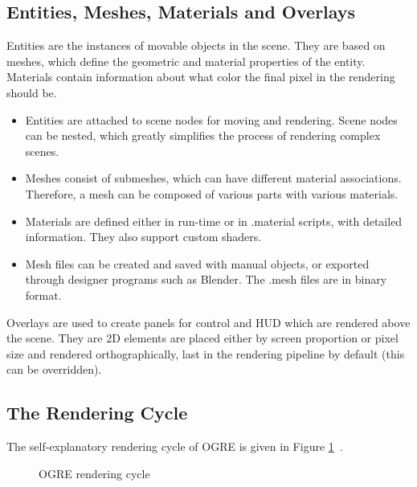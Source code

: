 \subsection{Entities, Meshes, Materials and Overlays}
Entities are the instances of movable objects in the scene. They are based on meshes, which define the geometric and material properties of the entity. Materials contain information about what color the final pixel in the rendering should be. 
\begin{itemize}
\item Entities are attached to scene nodes for moving and rendering. Scene nodes can be nested, which greatly simplifies the process of rendering complex scenes.
\item Meshes consist of submeshes, which can have different material associations. Therefore, a mesh can be composed of various parts with various materials.
\item Materials are defined either in run-time or in .material scripts, with detailed information. They also support custom shaders.
\item Mesh files can be created and saved with manual objects, or exported through designer programs such as Blender. The .mesh files are in binary format.
\end{itemize}
Overlays are used to create panels for control and HUD which are rendered above the scene. They are 2D elements are placed either by screen proportion or pixel size and rendered orthographically, last in the rendering pipeline by default (this can be overridden).

\subsection{The Rendering Cycle}
The self-explanatory rendering cycle of OGRE is given in Figure \ref{fig:ogre-render-cycle}~\cite{Moan2012}.

\begin{figure}[h]
\centerline{}
\caption{OGRE rendering cycle}
\label{fig:ogre-render-cycle}
\end{figure}
 